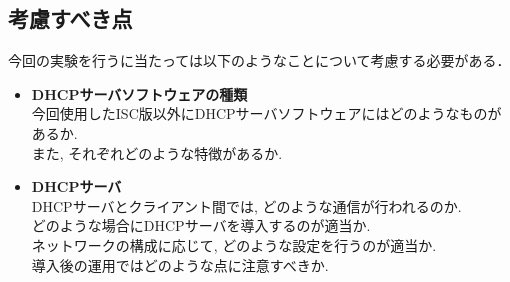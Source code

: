 \subsection*{考慮すべき点}
今回の実験を行うに当たっては以下のようなことについて考慮する必要がある．
\begin{itemize}
  \item \textbf{DHCPサーバソフトウェアの種類}\\
	今回使用したISC版以外にDHCPサーバソフトウェアにはどのようなものがあるか.\\
	また, それぞれどのような特徴があるか.\\
	
  \item \textbf{DHCPサーバ}\\
	DHCPサーバとクライアント間では, どのような通信が行われるのか.\\
	どのような場合にDHCPサーバを導入するのが適当か.\\
	ネットワークの構成に応じて, どのような設定を行うのが適当か.\\
	導入後の運用ではどのような点に注意すべきか.\\
	
\end{itemize}
